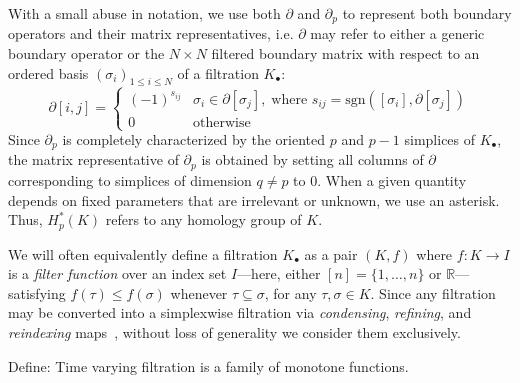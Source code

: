 With a small abuse in notation, we use both $\partial$ and $\partial_p$ to represent both boundary operators and their matrix representatives, i.e. $\partial$ may refer to either a generic boundary operator or the $N \times N$ filtered boundary matrix with respect to an ordered basis $(\sigma_i)_{1 \leq i \leq N}$ of a filtration $K_\bullet$:
\begin{equation}\label{eq:boundary_matrix}
	\partial[i,j] = \begin{cases}
		(-1)^{s_{ij}} & \sigma_i \in \partial[\sigma_j], \; \text{where } s_{ij} = \mathrm{sgn}([\sigma_i], \partial [\sigma_j])  \\
		0 & \text{otherwise}
	\end{cases}
\end{equation}
Since $\partial_p$ is completely characterized by the oriented $p$ and $p-1$ simplices of $K_\bullet$,   the matrix representative of $\partial_p$ is obtained by setting all columns of $\partial$ corresponding to simplices of dimension $q \neq p$ to $0$. When a given quantity depends on fixed parameters that are irrelevant or unknown, we use an asterisk. Thus, $H_p^\ast(K)$ refers to any homology group of $K$. 

	We will often equivalently define a filtration $K_\bullet$ as a pair $(K, f)$ where $f : K \to I$ is a \emph{filter function} over an index set $I$---here, either $[n] = \{ 1, \dots, n\}$ or $\mathbb{R}$---satisfying $f(\tau) \leq f(\sigma)$ whenever $\tau \subseteq \sigma$, for any $\tau,\sigma \in K$. 
Since any filtration may be converted into a simplexwise filtration via \emph{condensing}, \emph{refining}, and \emph{reindexing} maps~\cite{bauer2021ripser}, without loss of generality we consider them exclusively.

Define: Time varying filtration is a family of monotone functions. 

